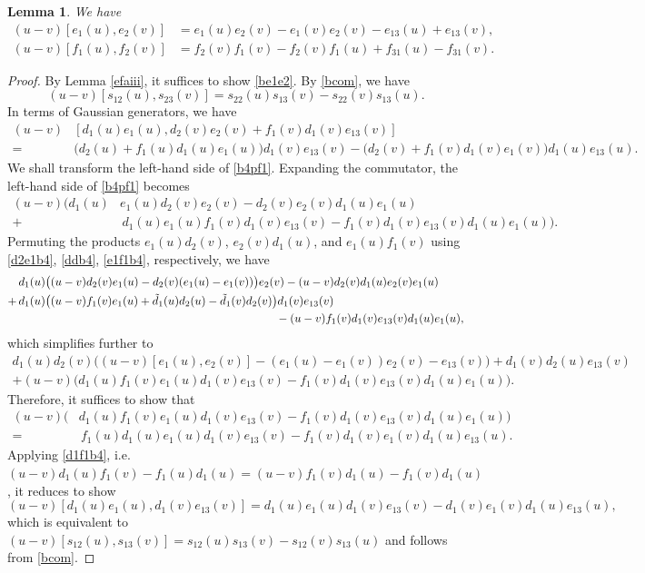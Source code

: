 \documentclass[11pt,reqno]{amsart}
\numberwithin{equation}{section}
\newtheorem{lem}[thm]{Lemma}
\theoremstyle{definition}
\theoremstyle{remark}
\newcommand{\beq}{\begin{equation}}
\newcommand{\eeq}{\end{equation}}
\newcommand{\tl}{\tilde}
\begin{document}
\begin{lem}\label{be1e2lem}
We have
\begin{align}
(u-v)[e_1(u),e_2(v)]&=e_1(u)e_2(v)-e_1(v)e_2(v)-e_{13}(u)+e_{13}(v),\label{be1e2}\\
(u-v)[f_1(u),f_2(v)]&=f_2(v)f_1(v)-f_2(v)f_1(u)+f_{31}(u)-f_{31}(v).\label{bf1f2}
\end{align}
\end{lem}
\begin{proof}
By Lemma \ref{efaiii}, it suffices to show \eqref{be1e2}. By \eqref{bcom}, we have 
\[
(u-v)[s_{12}(u),s_{23}(v)]=s_{22}(u)s_{13}(v)-s_{22}(v)s_{13}(u).
\]
In terms of Gaussian generators, we have
\beq\label{b4pf1}
\begin{split}
(u-v)&[d_1(u)e_1(u),d_2(v)e_2(v)+f_1(v)d_1(v)e_{13}(v)]\\=\, &\big(d_2(u)+f_1(u)d_1(u)e_1(u)\big)d_1(v)e_{13}(v)-\big(d_2(v)+f_1(v)d_1(v)e_1(v)\big)d_1(u)e_{13}(u).
\end{split}
\eeq
We shall transform the left-hand side of \eqref{b4pf1}. Expanding the commutator, the left-hand side of \eqref{b4pf1} becomes
\begin{align*}
(u-v)\Big(d_1(u)& e_1(u)d_2(v) e_2(v)-d_2(v) e_2(v)d_1(u) e_1(u)\\
+&\, d_1(u) e_1(u)f_1(v) d_1(v)e_{13}(v)-f_1(v)d_1(v)e_{13}(v)d_1(u)e_1(u)\Big).
\end{align*}
Permuting the products $e_1(u)d_2(v)$, $e_2(v)d_1(u)$, and $e_1(u)f_1(v)$ using \eqref{d2e1b4}, \eqref{ddb4}, \eqref{e1f1b4}, respectively,  we have
\begin{align*}
&\,d_1(u) \big((u-v)d_2(v)e_1(u)-d_2(v)(e_1(u)-e_1(v))\big) e_2(v)-(u-v)d_2(v) d_1(u)e_2(v) e_1(u)\\
+&\,d_1(u) \big((u-v)f_1(v)e_1(u)+\tl d_1(u)d_2(u)-\tl d_1(v)d_2(v)\big) d_1(v)e_{13}(v)\\
&\hskip7.9cm-(u-v)f_1(v)d_1(v)e_{13}(v)d_1(u)e_1(u),
\end{align*}
which simplifies further to
\begin{align*}
d_1(u)d_2(v)\big((u-v)[e_1(u),e_2(v)]-(e_1(u)-e_1(v))e_2(v)-e_{13}(v)\big)+d_1(v)d_2(u)e_{13}(v)\\
+(u-v)\big(d_1(u)f_1(v)e_1(u)d_1(v)e_{13}(v)-f_1(v)d_1(v)e_{13}(v)d_1(u)e_1(u)\big).
\end{align*}
Therefore, it suffices to show that
\begin{align*}
(u-v)\big(& d_1(u)f_1(v)e_1(u)d_1(v)e_{13}(v)-f_1(v)d_1(v)e_{13}(v)d_1(u)e_1(u)\big)\\
=&\,f_1(u)d_1(u)e_1(u) d_1(v)e_{13}(v)- f_1(v)d_1(v)e_1(v) d_1(u)e_{13}(u).
\end{align*}
Applying \eqref{d1f1b4}, i.e. $(u-v)d_1(u)f_1(v)-f_1(u)d_1(u)=(u-v)f_1(v)d_1(u)-f_1(v)d_1(u)$, it reduces to show
\beq\label{b4pf2}
(u-v)[d_1(u)e_1(u),d_1(v)e_{13}(v)]=d_1(u)e_1(u)d_1(v)e_{13}(v)-d_1(v)e_1(v)d_1(u)e_{13}(u),
\eeq
which is equivalent to $(u-v)[s_{12}(u),s_{13}(v)]=s_{12}(u)s_{13}(v)-s_{12}(v)s_{13}(u)$ and follows from \eqref{bcom}.
\end{proof}
\end{document}
